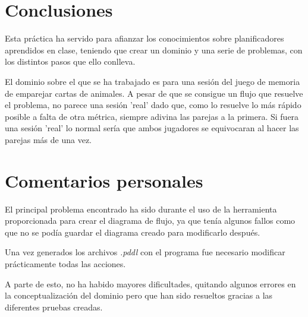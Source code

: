 \documentclass{uc3mpracticas}
\begin{document}
  \section{Conclusiones}

  Esta práctica ha servido para afianzar los conocimientos sobre planificadores aprendidos en clase, teniendo que crear un dominio y una serie de problemas, con los distintos pasos que ello conlleva.

  \vspace{2mm}

  El dominio sobre el que se ha trabajado es para una sesión del juego de memoria de emparejar cartas de animales. A pesar de que se consigue un flujo que resuelve el problema, no parece una sesión 'real' dado que, como lo resuelve lo más rápido posible a falta de otra métrica, siempre adivina las parejas a la primera. Si fuera una sesión 'real' lo normal sería que ambos jugadores se equivocaran al hacer las parejas más de una vez.

  \section{Comentarios personales}

  El principal problema encontrado ha sido durante el uso de la herramienta proporcionada para crear el diagrama de flujo, ya que tenía algunos fallos como que no se podía guardar el diagrama creado para modificarlo después.

  \vspace{2mm}

  Una vez generados los archivos \textit{.pddl} con el programa fue necesario modificar prácticamente todas las acciones.

  \vspace{2mm}

  A parte de esto, no ha habido mayores dificultades, quitando algunos errores en la conceptualización del dominio pero que han sido resueltos gracias a las diferentes pruebas creadas.
\end{document}

